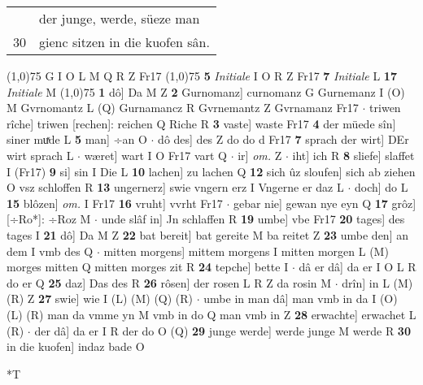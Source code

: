 \documentclass[8pt,a4paper,notitlepage]{article}
\begin{document}
\begin{table}[ht]
\begin{minipage}[t]{0.5\linewidth}
\begin{tabular}{rl}
 & der junge, werde, süeze man\\ 
30 & gienc sitzen in die kuofen sân.\\ 
\end{tabular}
\scriptsize
\line(1,0){75} \newline
G I O L M Q R Z Fr17 \newline
\line(1,0){75} \newline
\textbf{5} \textit{Initiale} I O R Z Fr17  \textbf{7} \textit{Initiale} L  \textbf{17} \textit{Initiale} M  \newline
\line(1,0){75} \newline
\textbf{1} dô] Da M Z \textbf{2} Gurnomanz] curnomanz G Gurnemanz I (O) M Gvrnomantz L (Q) Gurnamancz R Gvrnemantz Z Gvrnamanz Fr17  $\cdot$ triwen rîche] triwen [rechen]: reichen Q Riche R \textbf{3} vaste] waste Fr17 \textbf{4} der müede sîn] siner muͯde L \textbf{5} man] ÷an O  $\cdot$ dô des] des Z do do d Fr17 \textbf{7} sprach der wirt] DEr wirt sprach L  $\cdot$ wæret] wart I O Fr17 vart Q  $\cdot$ ir] \textit{om.} Z  $\cdot$ iht] ich R \textbf{8} sliefe] slaffet I (Fr17) \textbf{9} si] sin I Die L \textbf{10} lachen] zu lachen Q \textbf{12} sich ûz sloufen] sich ab ziehen O vsz schloffen R \textbf{13} ungernerz] swie vngern erz I Vngerne er daz L  $\cdot$ doch] do L \textbf{15} blôzen] \textit{om.} I Fr17 \textbf{16} vruht] vvrht Fr17  $\cdot$ gebar nie] gewan nye eyn Q \textbf{17} grôz] [÷Ro*]: ÷Roz M  $\cdot$ unde slâf in] Jn schlaffen R \textbf{19} umbe] vbe Fr17 \textbf{20} tages] des tages I \textbf{21} dô] Da M Z \textbf{22} bat bereit] bat gereite M ba reitet Z \textbf{23} umbe den] an dem I vmb des Q  $\cdot$ mitten morgens] mittem morgens I mitten morgen L (M) morges mitten Q mitten morges zit R \textbf{24} tepche] bette I  $\cdot$ dâ er dâ] da er I O L R do er Q \textbf{25} daz] Das des R \textbf{26} rôsen] der rosen L R Z da rosin M  $\cdot$ drîn] in L (M) (R) Z \textbf{27} swie] wie I (L) (M) (Q) (R)  $\cdot$ umbe in man dâ] man vmb in da I (O) (L) (R) man da vmme yn M vmb in do Q man vmb in Z \textbf{28} erwachte] erwachet L (R)  $\cdot$ der dâ] da er I R der do O (Q) \textbf{29} junge werde] werde junge M werde R \textbf{30} in die kuofen] indaz bade O \newline
\end{minipage}
\hspace{0.5cm}
\begin{minipage}[t]{0.5\linewidth}
\small
\begin{center}*T
\end{center}
\begin{tabular}{rl}

\end{tabular}
\end{minipage}
\end{table}
\end{document}
